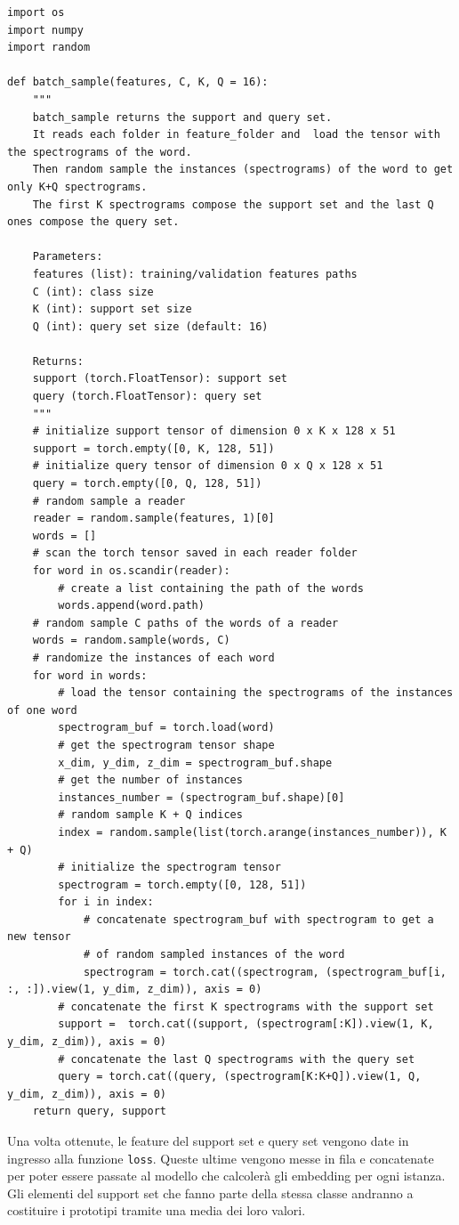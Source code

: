 \documentclass[12pt,a4paper,titlepage]{article}
\begin{document}
\begin{lstlisting}[language=iPython,firstnumber=1, caption=batch\_sample, label=batch_sample,captionpos=b]
import os
import numpy
import random

def batch_sample(features, C, K, Q = 16):
    """
    batch_sample returns the support and query set. 
    It reads each folder in feature_folder and  load the tensor with the spectrograms of the word.
    Then random sample the instances (spectrograms) of the word to get only K+Q spectrograms. 
    The first K spectrograms compose the support set and the last Q ones compose the query set.

    Parameters:
    features (list): training/validation features paths
    C (int): class size
    K (int): support set size
    Q (int): query set size (default: 16)

    Returns:
    support (torch.FloatTensor): support set
    query (torch.FloatTensor): query set
    """
    # initialize support tensor of dimension 0 x K x 128 x 51
    support = torch.empty([0, K, 128, 51])
    # initialize query tensor of dimension 0 x Q x 128 x 51
    query = torch.empty([0, Q, 128, 51])
    # random sample a reader
    reader = random.sample(features, 1)[0]
    words = []
    # scan the torch tensor saved in each reader folder
    for word in os.scandir(reader):
        # create a list containing the path of the words
        words.append(word.path)
    # random sample C paths of the words of a reader
    words = random.sample(words, C)
    # randomize the instances of each word
    for word in words:
        # load the tensor containing the spectrograms of the instances of one word
        spectrogram_buf = torch.load(word)
        # get the spectrogram tensor shape
        x_dim, y_dim, z_dim = spectrogram_buf.shape
        # get the number of instances
        instances_number = (spectrogram_buf.shape)[0]
        # random sample K + Q indices
        index = random.sample(list(torch.arange(instances_number)), K + Q)
        # initialize the spectrogram tensor
        spectrogram = torch.empty([0, 128, 51])
        for i in index:
            # concatenate spectrogram_buf with spectrogram to get a new tensor 
            # of random sampled instances of the word
            spectrogram = torch.cat((spectrogram, (spectrogram_buf[i, :, :]).view(1, y_dim, z_dim)), axis = 0)
        # concatenate the first K spectrograms with the support set
        support =  torch.cat((support, (spectrogram[:K]).view(1, K, y_dim, z_dim)), axis = 0)
        # concatenate the last Q spectrograms with the query set
        query = torch.cat((query, (spectrogram[K:K+Q]).view(1, Q, y_dim, z_dim)), axis = 0)
    return query, support
\end{lstlisting}
Una volta ottenute, le feature del support set e query set vengono date in ingresso alla funzione \texttt{loss}.
Queste ultime vengono messe in fila e concatenate per poter essere passate al modello che calcolerà gli embedding per ogni istanza.
Gli elementi del support set che fanno parte della stessa classe andranno a costituire i prototipi tramite una media dei loro valori.
\end{document}
